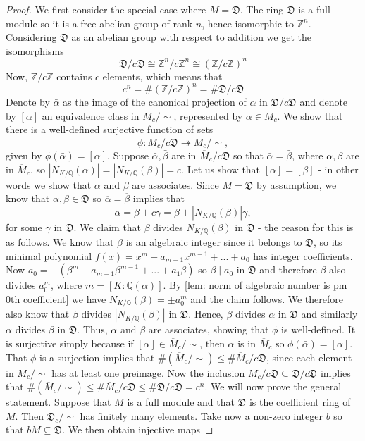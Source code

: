 \documentclass{article}
\newcommand{\mfrak}[1]{\mathfrak{#1}}
\newcommand{\mbb}[1]{\mathbb{#1}}
\numberwithin{equation}{section}
\begin{document}
\begin{proof}
    We first consider the special case where $M = \mfrak D$. The ring $\mfrak D$ is a full module so it is a free abelian group of rank $n$, hence isomorphic to $\mbb Z^n$. Considering $\mfrak D$ as an abelian group with respect to addition we get the isomorphisms
    $$\mfrak D/c \mfrak D \cong \mbb Z^n/c \mbb Z^n \cong (\mbb Z/c \mbb Z)^n$$
    Now, $\mbb Z / c \mbb Z$ contains $c$ elements, which means that
    $$c^n = \# (\mbb Z/c \mbb Z)^n = \# \mfrak D/c \mfrak D$$
    Denote by $\bar \alpha$ as the image of the canonical projection of $\alpha$ in $\mfrak D/c \mfrak D$ and denote by $[\alpha]$ an equivalence class in $\overline M_c / \sim$, represented by $\alpha \in \overline M_c$. We show that there is a well-defined surjective function of sets
    $$\phi : \overline M_c /c \mfrak D \twoheadrightarrow  \overline M_c / \sim,$$
    given by $\phi(\bar \alpha) = [\alpha]$. Suppose $\bar \alpha, \bar \beta$ are in $\overline M_c /c \mfrak D$ so that $\bar \alpha = \bar \beta$, where $\alpha, \beta$ are in $\overline M_c$, so $|N_{K/\mbb Q}(\alpha)| = |N_{K/\mbb Q}(\beta)| = c$. Let us show that $[\alpha] = [\beta]$ - in other words we show that $\alpha$ and $\beta$ are associates. Since $M = \mfrak D$ by assumption, we know that $\alpha, \beta \in \mfrak D$ so $\overline \alpha = \overline \beta$ implies that
    $$\alpha = \beta + c \gamma = \beta + |N_{K/\mbb Q}(\beta)| \gamma,$$
    for some $\gamma$ in $\mfrak D$. We claim that $\beta$ divides $N_{K/\mbb Q}(\beta)$ in $\mathfrak D$ - the reason for this is as follows. We know that $\beta$ is an algebraic integer since it belongs to $\mfrak D$, so its minimal polynomial $f(x) = x^m + a_{m-1}x^{m-1} + ... + a_0$ has integer coefficients. Now $a_0 = -(\beta^m + a_{m-1}\beta^{m-1} + ... + a_1\beta)$ so $\beta \mid a_0$ in $\mfrak D$ and therefore $\beta$ also divides $a_0^m$, where $m = [K : \mbb Q(\alpha)]$. By \cref{lem: norm of algebraic number is pm 0th coefficient} we have $N_{K/\mbb Q}(\beta) = \pm a_0^m$ and the claim follows. We therefore also know that $\beta$ divides $|N_{K/\mbb Q}(\beta)|$ in $\mfrak D$. Hence, $\beta$ divides $\alpha$ in $\mfrak D$ and similarly $\alpha$ divides $\beta$ in $\mfrak D$. Thus, $\alpha$ and $\beta$ are associates, showing that $\phi$ is well-defined. It is surjective simply because if $[\alpha] \in \overline M_c / \sim$, then $\alpha$ is in $\overline M_c$ so $\phi(\bar \alpha) = [\alpha]$. That $\phi$ is a surjection implies that $\# (\overline M_c / \sim) \leq \# \overline M_c / c \mfrak D$, since each element in $\overline M_c /\sim$ has at least one preimage. Now the inclusion $\overline M_c / c \mfrak D \subseteq \mfrak D / c \mfrak D$ implies that $\# (\overline M_c / \sim) \leq \# \overline M_c / c \mfrak D \leq \# \mfrak D / c \mfrak D = c^n$. We will now prove the general statement. Suppose that $M$ is a full module and that $\mfrak D$ is the coefficient ring of $M$. Then $\overline {\mfrak{D}}_c / \sim$ has finitely many elements. Take now a non-zero integer $b$ so that $bM \subseteq \mfrak D$. We then obtain injective maps

\end{proof}
\end{document}
